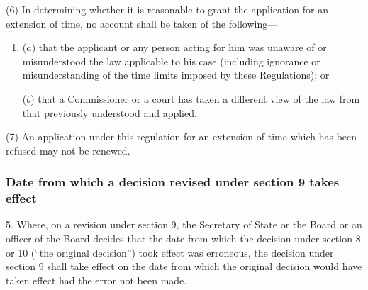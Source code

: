 \documentclass[12pt,a4paper]{article}
\begin{document}
(6) In determining whether it is reasonable to grant the application for an extension of time, no account shall be taken of the following—
\begin{enumerate}\item[]
($a$) that the applicant or any person acting for him was unaware of or misunderstood the law applicable to his case (including ignorance or misunderstanding of the time limits imposed by these Regulations); or

($b$) that a Commissioner%
%
or a court has taken a different view of the law from that previously understood and applied.
\end{enumerate}

(7) An application under this regulation for an extension of time which has been refused may not be renewed.


\subsubsection[5. Date from which a decision revised under section 9 takes effect]{Date from which a decision revised under section 9 takes effect}

5.  Where, on a revision under section 9, the Secretary of State
or the Board or an officer of the Board  %
decides that the date from which the decision under section 8 or 10 (“the original decision”) took effect was erroneous, the decision under section 9 shall take effect on the date from which the original decision would have taken effect had the error not been made.

\end{document}
